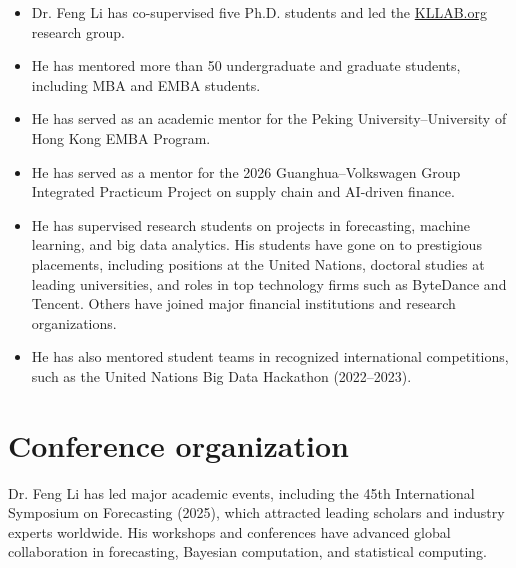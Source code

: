 \documentclass[twoside,a4paper]{article}
\begin{document}
\begin{itemize}
\item Dr. Feng Li has co-supervised five Ph.D. students and led the \href{https://kllab.org}{KLLAB.org} research group.

\item He has mentored more than 50 undergraduate and graduate students, including MBA and EMBA students.

\item He has served as an academic mentor for the Peking University--University of Hong Kong EMBA Program.

\item He has served as a mentor for the 2026 Guanghua--Volkswagen Group Integrated Practicum Project on supply chain and AI-driven finance.

\item He has supervised research students on projects in forecasting, machine learning, and big data analytics. His students have gone on to prestigious placements, including positions at the United Nations, doctoral studies at leading universities, and roles in top technology firms such as ByteDance and Tencent. Others have joined major financial institutions and research organizations.

\item He has also mentored student teams in recognized international competitions, such as the United Nations Big Data Hackathon (2022--2023).

\end{itemize}

\section{Conference organization}

Dr. Feng Li has led major academic events, including the 45th International Symposium on Forecasting (2025), which attracted leading scholars and industry experts worldwide. His workshops and conferences have advanced global collaboration in forecasting, Bayesian computation, and statistical computing.
\end{document}
